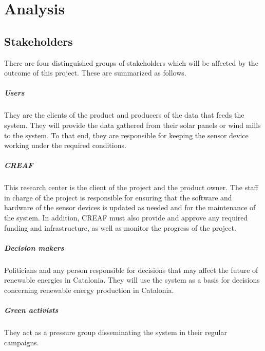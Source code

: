 \chapter{Analysis}

\section{Stakeholders}

There are four distinguished groups of stakeholders which will be affected by the outcome of this project. These are summarized as follows.

\paragraph{Users} They are the clients of the product and producers of the data that feeds the system. They will provide the data gathered from their solar panels or wind mills to the system. To that end, they are responsible for keeping the sensor device working under the required conditions.
\paragraph{CREAF} This research center is the client of the project and the product owner. The staff in charge of the project is responsible for ensuring that the software and hardware of the sensor devices is updated as needed and for the maintenance of the system. In addition, CREAF must also provide and approve any required funding and infrastructure, as well as monitor the progress of the project.
\paragraph{Decision makers} Politicians and any person responsible for decisions that may affect the future of renewable energies in Catalonia. They will use the system as a basis for decisions concerning renewable energy production in Catalonia.
\paragraph{Green activists} They act as a pressure group disseminating the system in their regular campaigns.

